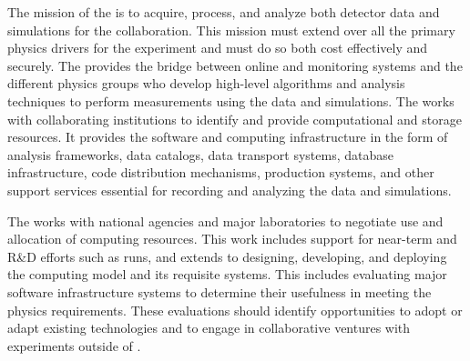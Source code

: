 The mission of the  %
 is to acquire, process, and analyze both detector data and  simulations for the %
collaboration.  This mission must extend over all the primary physics drivers for the experiment and must do so both cost effectively and securely. The  provides the bridge between  online  and monitoring systems and the different physics groups who develop high-level algorithms and analysis techniques to perform measurements using the   data and simulations. The  works with collaborating institutions to identify and provide computational and storage resources.  %
It provides the software and computing infrastructure in the form of analysis frameworks, data catalogs, data transport systems, database infrastructure, code distribution mechanisms, production systems, and other support services essential for recording and analyzing the data and simulations. 

The  works with national agencies and major laboratories to negotiate use and allocation of computing resources.  This work includes support for near-term and R\&D efforts %
such as  runs, and extends to designing, developing, and deploying the  computing model and its requisite systems. 
This includes evaluating major software infrastructure systems to determine their usefulness %
in meeting the  physics requirements.   These evaluations should identify opportunities to adopt or adapt existing technologies and to engage in collaborative ventures with  experiments outside of . 


